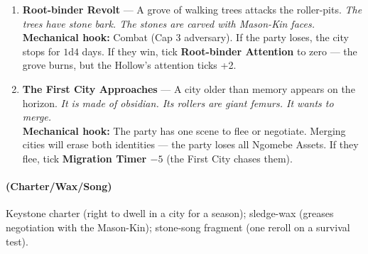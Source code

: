 \begin{enumerate}
\item[K] \textbf{Root-binder Revolt} --- A grove of walking trees attacks the roller-pits.
  \hfill \textit{The trees have stone bark. The stones are carved with Mason-Kin faces.} \\
  \textbf{Mechanical hook:} Combat (Cap 3 adversary). If the party loses, the city stops for $1\text{d}4$ days. If they win, tick \textbf{Root-binder Attention} to zero --- the grove burns, but the Hollow's attention ticks +2.

\item[A] \textbf{The First City Approaches} --- A city older than memory appears on the horizon.
  \hfill \textit{It is made of obsidian. Its rollers are giant femurs. It wants to merge.} \\
  \textbf{Mechanical hook:} The party has one scene to flee or negotiate. Merging cities will erase both identities --- the party loses all Ngomebe Assets. If they flee, tick \textbf{Migration Timer $-5$} (the First City chases them).
\end{enumerate}

\paragraph*{(Charter/Wax/Song)} Keystone charter (right to dwell in a city for a season); sledge-wax (greases negotiation with the Mason-Kin); stone-song fragment (one reroll on a survival test).

